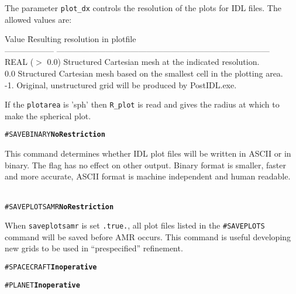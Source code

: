 The parameter {\tt plot\_dx} controls the resolution of the plots for IDL
files.  The allowed values  are:
\begin{tabbing}
Value \hspace{1.0in} \= Resulting resolution in plotfile\\
------------------ \> ------------------------------------------------------------------------------ \\
 REAL ($>$ 0.0)	       \> Structured Cartesian mesh at the indicated resolution. \\
 0.0	               \> Structured Cartesian mesh based on the smallest cell 
                          in the plotting area. \\
 -1.	               \> Original, unstructured grid will be produced by PostIDL.exe.
\end{tabbing}


If the {\tt plotarea} is 'sph' then {\tt R\_plot} is read and gives
the radius at which to make the spherical plot.
\ \ \\

\begin{alltt}
#SAVEBINARY    \hfill {\bf No Restriction}
\end{alltt}

This command determines whether IDL plot files will be written in ASCII
or in binary.  The flag has no effect on other output.  Binary format
is smaller, faster and more accurate, ASCII format is machine independent
and human readable.
\ \ \\

\begin{alltt}
#SAVEPLOTSAMR    \hfill {\bf No Restriction}
\end{alltt}

When {\tt saveplotsamr} is set {\tt .true.}, all plot files listed in
the {\tt \#SAVEPLOTS} command will be saved before AMR occurs.  This
command is useful developing new grids to be used in ``prespecified''
refinement.
\ \ \\

\begin{alltt}
#SPACECRAFT    \hfill {\bf Inoperative}
\end{alltt}

\begin{alltt} 
#PLANET    \hfill {\bf Inoperative}
\end{alltt}



